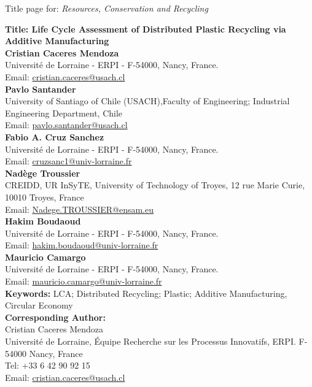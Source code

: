 \documentclass[]{elsarticle} %
\begin{document}
\begin{titlepage}
\begin{center}
		Title page for: \large\textit{Resources, Conservation and Recycling} \\
\end{center}
		\Large\textbf{Title: Life Cycle Assessment of Distributed Plastic Recycling via Additive Manufacturing}\\

\normalsize\textbf{Cristian Caceres Mendoza}\\
Université de Lorraine - ERPI -  F-54000, Nancy, France.\\
Email: \url{cristian.caceres@usach.cl}\\


\normalsize\textbf{Pavlo Santander}\\
University of Santiago of Chile (USACH),Faculty of Engineering; Industrial Engineering Department, Chile\\
Email: \url{pavlo.santander@usach.cl}\\

\textbf{Fabio A. Cruz Sanchez}\\
Université de Lorraine - ERPI -  F-54000, Nancy, France.\\
Email: \url{cruzsanc1@univ-lorraine.fr}\\

\textbf{Nadège Troussier}\\
CREIDD, UR InSyTE, University of Technology of Troyes, 12 rue Marie Curie, 10010 Troyes, France\\
Email: \url{Nadege.TROUSSIER@ensam.eu}\\


\textbf{Hakim Boudaoud}\\
Université de Lorraine - ERPI -  F-54000, Nancy, France.\\
Email: \url{hakim.boudaoud@univ-lorraine.fr}\\

\textbf{Mauricio Camargo}\\
Université de Lorraine - ERPI -  F-54000, Nancy, France.\\
Email: \url{mauricio.camargo@univ-lorraine.fr}\\[2mm]


\textbf{Keywords:} LCA; Distributed Recycling; Plastic; Additive Manufacturing, Circular Economy\\


\textbf{Corresponding Author:}\\
Cristian Caceres Mendoza \\
Université de Lorraine, Équipe Recherche sur les Processus Innovatifs, ERPI. F-54000 Nancy, France \\
Tel: +33 6 42 90 92 15 \\
Email: \url{cristian.caceres@usach.cl}\\[3mm]



\vfill
\end{titlepage}
\end{document}
